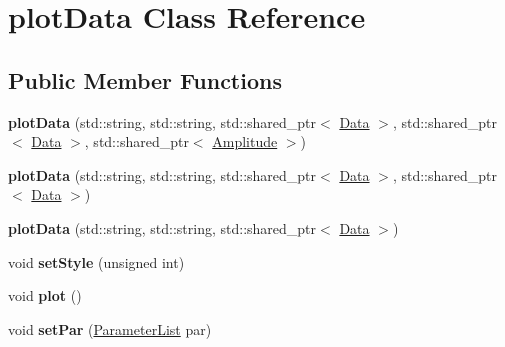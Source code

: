 \hypertarget{classplot_data}{\section{plot\-Data Class Reference}
\label{classplot_data}
}
\subsection*{Public Member Functions}
\begin{DoxyCompactItemize}
\item 
\hypertarget{classplot_data_acdd866143ff0eda48ad05ed6a9406064}{{\bfseries plot\-Data} (std\-::string, std\-::string, std\-::shared\-\_\-ptr$<$ \hyperlink{class_data}{Data} $>$, std\-::shared\-\_\-ptr$<$ \hyperlink{class_data}{Data} $>$, std\-::shared\-\_\-ptr$<$ \hyperlink{class_amplitude}{Amplitude} $>$)}\label{classplot_data_acdd866143ff0eda48ad05ed6a9406064}

\item 
\hypertarget{classplot_data_a360a3e00ce2ae6c494f7a3a5e5110394}{{\bfseries plot\-Data} (std\-::string, std\-::string, std\-::shared\-\_\-ptr$<$ \hyperlink{class_data}{Data} $>$, std\-::shared\-\_\-ptr$<$ \hyperlink{class_data}{Data} $>$)}\label{classplot_data_a360a3e00ce2ae6c494f7a3a5e5110394}

\item 
\hypertarget{classplot_data_a960bc088d55bf3be664ccbb78d8d8178}{{\bfseries plot\-Data} (std\-::string, std\-::string, std\-::shared\-\_\-ptr$<$ \hyperlink{class_data}{Data} $>$)}\label{classplot_data_a960bc088d55bf3be664ccbb78d8d8178}

\item 
\hypertarget{classplot_data_a3a2922325fe4893c9bdd797475ec308b}{void {\bfseries set\-Style} (unsigned int)}\label{classplot_data_a3a2922325fe4893c9bdd797475ec308b}

\item 
\hypertarget{classplot_data_a92f909762af29c778861863cf9ddb54a}{void {\bfseries plot} ()}\label{classplot_data_a92f909762af29c778861863cf9ddb54a}

\item 
\hypertarget{classplot_data_a6636461b1721b5ff34270ffa1347d9cb}{void {\bfseries set\-Par} (\hyperlink{class_parameter_list}{Parameter\-List} par)}\label{classplot_data_a6636461b1721b5ff34270ffa1347d9cb}

\end{DoxyCompactItemize}
